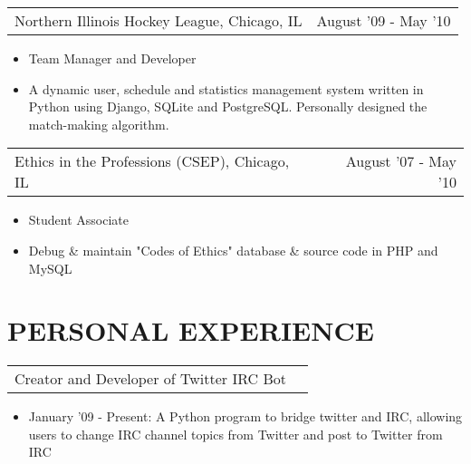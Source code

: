\documentclass[margin, line]{res}
\begin{document}
\begin{resume}
\begin{tabular}{p{3in} r}
	Northern Illinois Hockey League, Chicago, IL & August '09  - May '10 
\end{tabular}
	\begin{itemize} \itemsep -2pt
		\item[] Team Manager and Developer
		\item[] A dynamic user, schedule and statistics management system written in Python using Django, SQLite and PostgreSQL. Personally designed the match-making algorithm.
	\end{itemize}

\begin{tabular}{p{3in} r} %
	Ethics in the Professions (CSEP), Chicago, IL & August '07 - May '10
\end{tabular}
	\begin{itemize}  \itemsep -2pt%
		\item[] Student Associate
		\item[] Debug \& maintain "Codes of Ethics" database \& source code in PHP and MySQL
	\end{itemize}
	
\begin{comment}
\begin{tabular}{p{3in} r} %
	Software Engineering Term Project, Chicago, IL &  August '09 - December '09
\end{tabular}
	\begin{itemize}  \itemsep -2pt%
		\item[] Team Leader, Designer and Developer for course CS 485
		\item[] A dynamic user, purchase, and product management prototype application written in PHP using CakePHP and MySQL
	\end{itemize}
\end{comment}

\section{PERSONAL EXPERIENCE}

\begin{tabular}{p{3in} r}
	Creator and Developer of Twitter IRC Bot
\end{tabular}	
	\begin{itemize} \itemsep -2pt
		\item[] January '09 - Present: A Python program to bridge twitter and IRC, allowing users to change IRC channel topics from Twitter and post to Twitter from IRC
	\end{itemize}


\end{resume}
\end{document}
